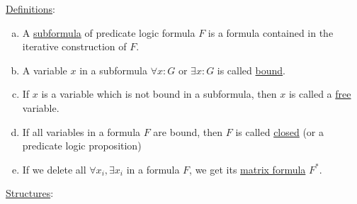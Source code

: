 \documentclass[a4paper]{article}
\newcommand{\ul}{\underline}
\begin{document}
\ul{Definitions}:
\begin{enumerate}[(a)]
	\item A \ul{subformula} of predicate logic formula $F$ is a formula contained in the iterative construction of $F$.
	\item A variable $x$ in a subformula $\forall x:G$ or $\exists x:G$ is called \ul{bound}.
	\item If $x$ is a variable which is not bound in a subformula, then $x$ is called a \ul{free} variable.
	\item If all variables in a formula $F$ are bound, then $F$ is called \ul{closed} (or a predicate logic proposition)
	\item If we delete all $\forall x_i,\exists x_i$ in a formula $F$, we get its \ul{matrix formula} $F^*$.
\end{enumerate}
\ul{Structures}:
\end{document}

